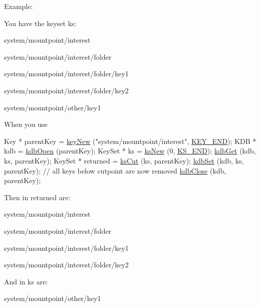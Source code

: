 \begin{DoxyParagraph}{Example\+:}

\end{DoxyParagraph}
You have the keyset {\ttfamily ks\+:} 
\begin{DoxyItemize}
\item {\ttfamily system/mountpoint/interest} 
\item {\ttfamily system/mountpoint/interest/folder} 
\item {\ttfamily system/mountpoint/interest/folder/key1} 
\item {\ttfamily system/mountpoint/interest/folder/key2} 
\item {\ttfamily system/mountpoint/other/key1} 
\end{DoxyItemize}

When you use 
\begin{DoxyCodeInclude}
        Key * parentKey = \hyperlink{group__key_gad23c65b44bf48d773759e1f9a4d43b89}{keyNew} (\textcolor{stringliteral}{"system/mountpoint/interest"}, \hyperlink{group__key_gga91fb3178848bd682000958089abbaf40aa8adb6fcb92dec58fb19410eacfdd403}{KEY\_END});
        KDB * kdb = \hyperlink{group__kdb_ga6808defe5870f328dd17910aacbdc6ca}{kdbOpen} (parentKey);
        KeySet * ks = \hyperlink{group__keyset_ga671e1aaee3ae9dc13b4834a4ddbd2c3c}{ksNew} (0, \hyperlink{kdbenum_8c_a7a28fce3773b2c873c94ac80b8b4cd54}{KS\_END});
        \hyperlink{group__kdb_ga28e385fd9cb7ccfe0b2f1ed2f62453a1}{kdbGet} (kdb, ks, parentKey);
        KeySet * returned = \hyperlink{group__keyset_ga6b00cf82b59af4d883a9bad6cf4a4a4a}{ksCut} (ks, parentKey);
        \hyperlink{group__kdb_ga11436b058408f83d303ca5e996832bcf}{kdbSet} (kdb, ks, parentKey); \textcolor{comment}{// all keys below cutpoint are now removed}
        \hyperlink{group__kdb_gadb54dc9fda17ee07deb9444df745c96f}{kdbClose} (kdb, parentKey);
\end{DoxyCodeInclude}
 Then in {\ttfamily returned} are\+:
\begin{DoxyItemize}
\item {\ttfamily system/mountpoint/interest} 
\item {\ttfamily system/mountpoint/interest/folder} 
\item {\ttfamily system/mountpoint/interest/folder/key1} 
\item {\ttfamily system/mountpoint/interest/folder/key2} 
\end{DoxyItemize}

And in {\ttfamily ks} are\+:
\begin{DoxyItemize}
\item {\ttfamily system/mountpoint/other/key1} 
\end{DoxyItemize}

